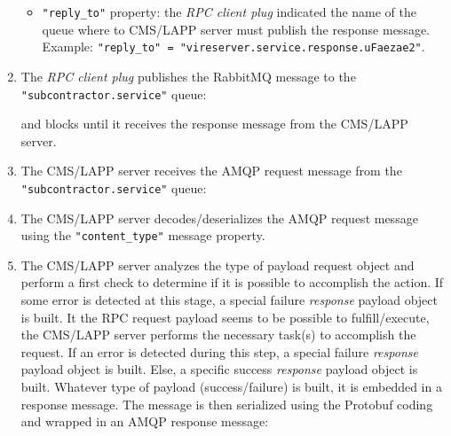 \begin{enumerate}
\begin{itemize}
  \item \texttt{"reply\_to"} property:  the \emph{RPC client plug}
    indicated the name of the queue where to CMS/LAPP server must publish
    the response message. \\
    Example:
    \texttt{"reply\_to" = "vireserver.service.response.uFaezae2"}.

  \end{itemize}
  \vskip 10pt
  \begin{center}
    \scalebox{0.7}{}
  \end{center}

\item  The \emph{RPC  client  plug}  publishes the RabbitMQ
  message to the \texttt{"subcontractor.service"} queue:
  \vskip 10pt
  \begin{center}
    \scalebox{0.6}{}
  \end{center}
  and blocks until it receives the response message from the CMS/LAPP server.

\item  The CMS/LAPP server receives the AMQP request message from the
  \texttt{"subcontractor.service"} queue:
  \vskip 10pt
  \begin{center}
    \scalebox{0.6}{}
  \end{center}

\item  The CMS/LAPP server decodes/deserializes the AMQP request message
  using the  \texttt{"content\_type"} message   property.
  \vskip 10pt
  \begin{center}
    \scalebox{0.6}{}
  \end{center}

\item  The CMS/LAPP server analyzes the type of payload request object
  and perform a first check to determine if it is possible to accomplish
  the action. If some error is detected at this stage,
  a special failure \emph{response} payload object is built. It the RPC request payload seems to be
  possible to fulfill/execute, the CMS/LAPP server performs the necessary task(s) to
  accomplish the request. If an error is detected during this step, a special failure \emph{response} payload
  object  is built. Else, a specific success \emph{response} payload object is built.
  Whatever type of payload (success/failure) is built, it is embedded in a response message.
  The message is then serialized using the Protobuf  coding and wrapped in an AMQP response message:


\end{enumerate}
